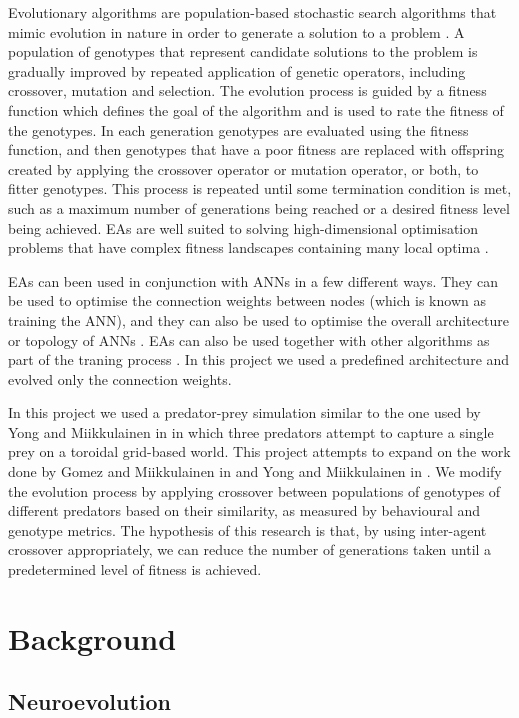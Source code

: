 \documentclass[12pt]{article} %
\begin{document}
Evolutionary algorithms are population-based stochastic search algorithms that mimic evolution in nature in order to generate a solution to a problem \cite{Floreano2008}\cite{Yao1999}. A population of genotypes that represent candidate solutions to the problem is gradually improved by repeated application of genetic operators, including crossover, mutation and selection. The evolution process is guided by a fitness function which defines the goal of the algorithm and is used to rate the fitness of the genotypes. In each generation genotypes are evaluated using the fitness function, and then genotypes that have a poor fitness are replaced with offspring created by applying the crossover operator or mutation operator, or both, to fitter genotypes. This process is repeated until some termination condition is met, such as a maximum number of generations being reached or a desired fitness level being achieved. EAs are well suited to solving high-dimensional optimisation problems that have complex fitness landscapes containing many local optima \cite{Yao1999}.

EAs can been used in conjunction with ANNs in a few different ways. They can be used to optimise the connection weights between nodes (which is known as training the ANN), and they can also be used to optimise the overall architecture or topology of ANNs \cite{Yao1999}. EAs can also be used together with other algorithms as part of the traning process \cite{Yao1999}. In this project we used a predefined architecture and evolved only the connection weights.

In this project we used a predator-prey simulation similar to the one used by Yong and Miikkulainen in \cite{Yong2001} in which three predators attempt to capture a single prey on a toroidal grid-based world. This project attempts to expand on the work done by Gomez and Miikkulainen in \cite{Gomez1997} and Yong and Miikkulainen in \cite{Yong2001}. We modify the evolution process by applying crossover between populations of genotypes of different predators based on their similarity, as measured by behavioural and genotype metrics. The hypothesis of this research is that, by using inter-agent crossover appropriately, we can reduce the number of generations taken until a predetermined level of fitness is achieved.

\section{Background}

\subsection{Neuroevolution}
\end{document}
